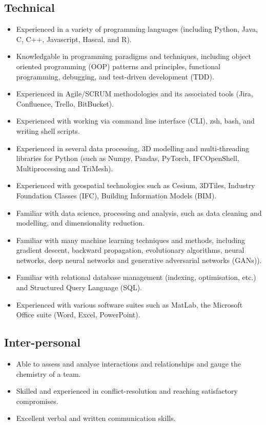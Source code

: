 \documentclass{article}
\begin{document}
\subsection*{Technical}
\begin{itemize}
	\item Experienced in a variety of programming languages (including Python, Java, C, C++, Javascript, Hascal, and R).
	\item Knowledgable in programming paradigms and techniques, including object oriented programming (OOP) patterns and principles, functional programming, debugging, and test-driven development (TDD).
	\item Experienced in Agile/SCRUM methodologies and its associated tools (Jira, Confluence, Trello, BitBucket).
	\item Experienced with working via command line interface (CLI), zsh, bash, and writing shell scripts.
	\item Experienced in several data processing, 3D modelling and multi-threading libraries for Python (such as Numpy, Pandas, PyTorch, IFCOpenShell, Multiprocessing and TriMesh).
	\item Experienced with geospatial technologies such as Cesium, 3DTiles, Industry Foundation Classes (IFC), Building Information Models (BIM).
	\item Familiar with data science, processing and analysis, such as data cleaning and modelling, and dimensionality reduction.
	\item Familiar with many machine learning techniques and methods, including gradient descent, backward propagation, evolutionary algorithms, neural networks, deep neural networks and generative adversarial networks (GANs)).
	\item Familiar with relational database management (indexing, optimisation, etc.) and Structured Query Language (SQL).
	\item Experienced with various software suites such as MatLab, the Microsoft Office suite (Word, Excel, PowerPoint).
\end{itemize}

\subsection*{Inter-personal}
\begin{itemize}
	\item Able to assess and analyse interactions and relationships and gauge the chemistry of a team.
	\item Skilled and experienced in conflict-resolution and reaching satisfactory compromises.
	\item Excellent verbal and written communication skills.
\end{itemize}
\end{document}
